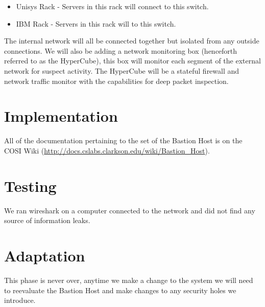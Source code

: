 \documentclass[11pt]{article}
\begin{document}
\begin{paragraph}
\begin{itemize}
\begin{itemize}
		\item Unisys Rack - Servers in this rack will connect to this switch.
		\item IBM Rack - Servers in this rack will to this switch.
	\end{itemize}	
\end{itemize}
The internal network will all be connected together but isolated from any outside connections.
We will also be adding a network monitoring box (henceforth referred to as the HyperCube), this box will monitor each segment of the external network for suspect activity.
The HyperCube will be a stateful firewall and network traffic monitor with the capabilities for deep packet inspection.
\end{paragraph}
\section{Implementation}
\begin{paragraph}\indent
All of the documentation pertaining to the set of the Bastion Host is on the COSI Wiki (\url{http://docs.cslabs.clarkson.edu/wiki/Bastion_Host}).
\end{paragraph}
\section{Testing}
\begin{paragraph}\indent
We ran wireshark on a computer connected to the network and did not find any source of information leaks.

\end{paragraph}
\section{Adaptation}
\begin{paragraph}\indent
This phase is never over, anytime we make a change to the system we will need to reevaluate the Bastion Host and make changes to any security holes we introduce.
\end{paragraph}
\end{document}
